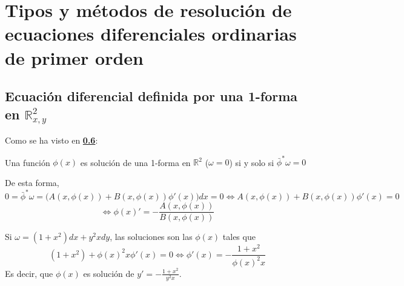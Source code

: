 
\appendix
\setcounter{chapter}{0}
\chapter{Tipos y métodos de resolución de ecuaciones diferenciales ordinarias de primer orden}
\section{Ecuación diferencial definida por una 1-forma en $\mathbb{R}_{x,y}^2$}
Como se ha visto en \hyperref[0.6]{\textbf{0.6}}:\begin{center}
    Una función $\phi(x)$ es solución de una 1-forma en $\mathbb R^2$ ($\omega=0$) si y solo si $\bar{\phi}^*\omega=0$
\end{center} De esta forma,
$$0=\bar{\phi}^* \omega=\Big(A(x,\phi(x))+B(x,\phi(x))\phi'(x)\Big)dx=0 \iff A(x,\phi(x))+B(x,\phi(x))\phi'(x)=0$$
$$\iff \phi(x)'=-\frac{A(x,\phi(x))}{B(x,\phi(x))}$$
\begin{eje}
    Si $\omega=(1+x^2)dx+y^2xdy$, las soluciones son las $\phi(x)$ tales que 
    $$(1+x^2)+\phi(x)^2 x \phi'(x)=0 \iff \phi'(x)=- \dfrac{1+x^2}{\phi(x)^2 x}$$
    Es decir, que $\phi(x)$ es solución de $y'=-\frac{1+x^2}{y^2x}$.
    \end{eje}
    
